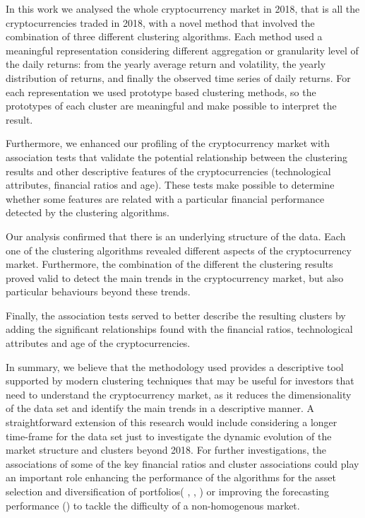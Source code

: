 \documentclass{bmcart}
\begin{document}
In this work we analysed the whole cryptocurrency market in 2018, that is all the cryptocurrencies traded in 2018, with a novel method that involved the combination of three different clustering algorithms. Each method used a meaningful representation considering different aggregation or granularity level of the daily returns: from the yearly average return and volatility, the yearly distribution of returns, and finally the observed time series of daily returns. For each representation we used prototype based clustering methods, so the prototypes of each cluster are meaningful and make possible to interpret the result. 

Furthermore, we enhanced our profiling of the cryptocurrency market with  association tests that validate the potential relationship between the clustering results and other descriptive features of the cryptocurrencies (technological attributes, financial ratios and age). These tests make possible to determine whether some features are related with a particular financial performance detected by the clustering algorithms.

Our analysis confirmed that there is an underlying structure of the data. Each one of the clustering algorithms revealed different aspects of the cryptocurrency market. Furthermore, the combination of the different the clustering results proved valid to detect  the main trends in the cryptocurrency market, but also particular behaviours beyond these trends.

Finally, the association tests served to better describe the resulting clusters by adding the significant relationships found with the financial ratios, technological attributes and age of the cryptocurrencies. 

In summary, we believe that the methodology used provides a descriptive tool supported by modern clustering techniques that may be useful for investors that need to understand the cryptocurrency market, as it reduces the dimensionality of the data set and identify the main trends in a descriptive manner. A straightforward extension of this research would include considering a longer time-frame for the data set just to investigate the dynamic evolution of the market structure and clusters beyond 2018. For further investigations, the associations of some of the key financial ratios and cluster associations could play an important role enhancing the performance of the algorithms for the asset selection and diversification of portfolios( \cite{Liu2019PortfolioDA}, \cite{platanakis2018optimal}, \cite{brauneis2019cryptocurrency})  or improving the forecasting performance (\cite{MMallikarjuna2019}) to tackle the difficulty of a non-homogenous market.
\end{document}
